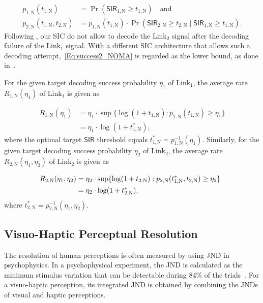 \documentclass[conference]{IEEEtran}
\def\SIR{\mathsf{SIR}}
\def\({\left(}
\def\){\right)}
\def\NOMA{\text{N}}
\def\L{\text{Link}}
\begin{document}
\vspace{-10pt}\small\begin{align}
p_{1,\NOMA}(t_{1,\NOMA}) &= \Pr\(\SIR_{1,\NOMA}\geq t_{1,\NOMA}\) \quad\text{and} \label{Eq:success1_NOMA}\\
p_{2,\NOMA}(t_{1,\NOMA},t_{2,\NOMA}) &= p_{1,\NOMA}(t_{1,\NOMA})\cdot \Pr\(\SIR_{2,\NOMA}\geq t_{2,\NOMA}\mid \SIR_{1,\NOMA}\geq t_{1,\NOMA}\). \label{Eq:success2_NOMA}
\end{align}\normalsize
Following \cite{JindalSIC:09}, our SIC do not allow to decode the $\L_2$ signal after the decoding failure of the $\L_1$ signal. With a different SIC architecture that allows such a decoding attempt,~\eqref{Eq:success2_NOMA} is regarded as the lower bound, as done in~\cite{Petar5G:18}.  



For the given target decoding success probability $\eta_1$ of $\L_1$, the average rate $R_{1,\NOMA}(\eta_1)$ of $\L_1$ is given as

\vspace{-10pt}\small\begin{align}
R_{1,\NOMA}(\eta_1) &= \eta_1 \cdot  \sup\{\log(1 + t_{1,\NOMA}): p_{1,\NOMA}(t_{1,\NOMA})\geq \eta_1\} \label{Eq:rate_NOMA_pre}\\
&= \eta_1 \cdot  \log(1 + t_{1,\NOMA}^*), \label{Eq:rate_NOMA}
\end{align}\normalsize
where the optimal target $\SIR$ threshold equals $t_{1,\NOMA}^* = p_{1,\NOMA}^{-1}(\eta_1)$. Similarly, for the given target decoding success probability $\eta_2$ of $\L_2$, the average rate $R_{2,\NOMA}(\eta_1,\eta_2)$ of $\L_2$ is given as

\vspace{-10pt}\small\begin{align}
\hspace{-5pt} R_{2,\NOMA}(\eta_1,\eta_2) &= \eta_2 \cdot  \sup\{\log(1 + t_{2,\NOMA}): p_{2,\NOMA}(t_{1,\NOMA}^*, t_{2,\NOMA})\geq \eta_2\} \label{Eq:rate_NOMA_pre}\\
&= \eta_2 \cdot  \log(1 + t_{2,\NOMA}^*), \label{Eq:rate_NOMA2}
\end{align}\normalsize
where $t_{2,\NOMA}^*=p_{2,\NOMA}^{-1}(\eta_1, \eta_2)$.


\subsection{Visuo-Haptic Perceptual Resolution} \label{Sect:Sys_JND}
The resolution of human perceptions is often measured by using JND in psychophysics. In a psychophysical experiment, the JND is calculated as the minimum stimulus variation that can be detectable during $84$\% of the trials~\cite{Ernst:2002aa}. For a visuo-haptic perception, its integrated JND is obtained by combining the JNDs of visual and haptic perceptions. 
\end{document}

